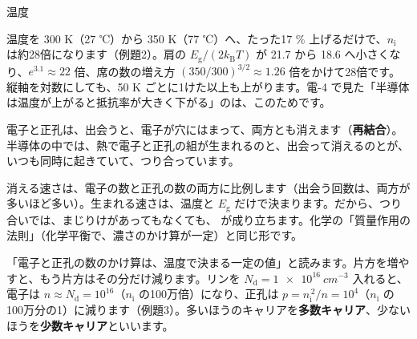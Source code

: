 \begin{phbaisuru}[300 K から 350 K]{温度}
\noindent\begin{minipage}[c]{0.45\linewidth}\raggedright
温度を 300 K（27 ℃）から 350 K（77 ℃）へ、たった17 \% 上げるだけで、$n_{\mathrm i}$ は約28倍になります（例題2）。肩の $E_{\mathrm g}/(2k_{\mathrm B}T)$ が 21.7 から 18.6 へ小さくなり、$e^{3.1}\approx22$ 倍、席の数の増え方 $(350/300)^{3/2}\approx1.26$ 倍をかけて28倍です。縦軸を対数にしても、50 K ごとに1けた以上も上がります。電-4 で見た「半導体は温度が上がると抵抗率が大きく下がる」のは、このためです。
\end{minipage}\hfill
\begin{minipage}[c]{0.52\linewidth}\centering
{}
\end{minipage}
\end{phbaisuru}

\label{ph:原-9:sec4}
電子と正孔は、出会うと、電子が穴にはまって、両方とも消えます（\textbf{再結合}）。半導体の中では、熱で電子と正孔の組が生まれるのと、出会って消えるのとが、いつも同時に起きていて、つり合っています。

消える速さは、電子の数と正孔の数の両方に比例します（出会う回数は、両方が多いほど多い）。生まれる速さは、温度と $E_{\mathrm g}$ だけで決まります。だから、つり合いでは、まじりけがあってもなくても、
\label{ph:原-9:np}が成り立ちます。化学の「質量作用の法則」（化学平衡で、濃さのかけ算が一定）と同じ形です。

\begin{phyomi}[$np=n_{\mathrm i}^{\,2}$]
「電子と正孔の数のかけ算は、温度で決まる一定の値」と読みます。片方を増やすと、もう片方はその分だけ減ります。リンを $N_{\mathrm d}=\qty{1e16}{cm^{-3}}$ 入れると、電子は $n\approx N_{\mathrm d}=10^{16}$（$n_{\mathrm i}$ の100万倍）になり、正孔は $p=n_{\mathrm i}^{\,2}/n=10^4$（$n_{\mathrm i}$ の100万分の1）に減ります（例題3）。多いほうのキャリアを\textbf{多数キャリア}、少ないほうを\textbf{少数キャリア}といいます。
\end{phyomi}

